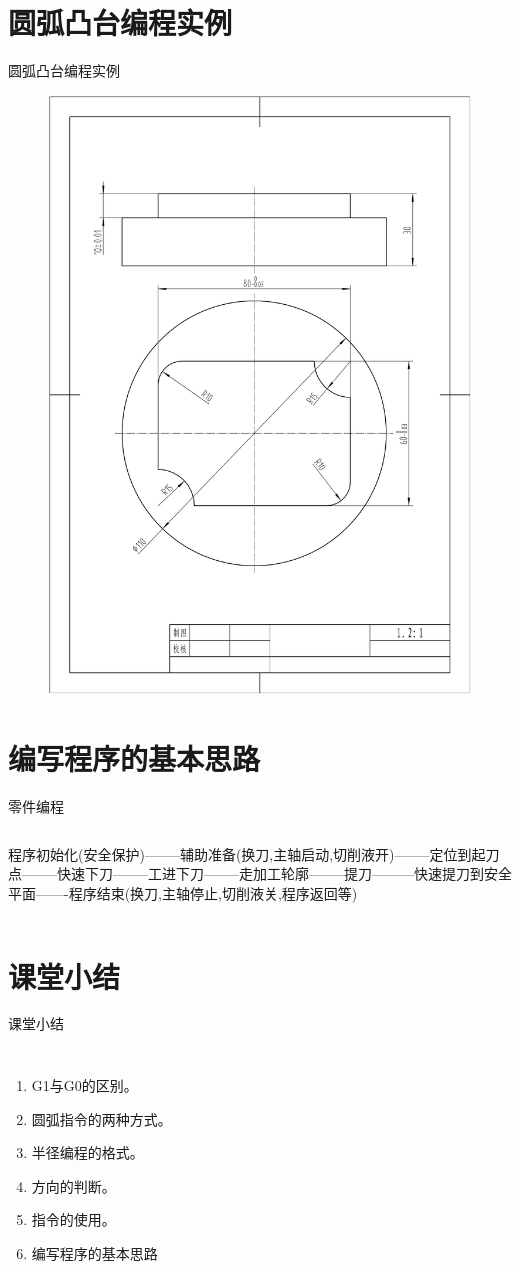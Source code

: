 \documentclass[UTF8,zihao=-4]{ctexbeamer}
\begin{document}
\section{圆弧凸台编程实例}
\begin{frame}{圆弧凸台编程实例}
    \begin{figure}
        \centering
        \includegraphics[width=0.5\linewidth,trim=50 150 50 100,clip]{image/4-1.jpg}
        \label{fig:4-8}
    \end{figure}       
\end{frame}

\section{编写程序的基本思路}
\begin{frame}{零件编程}
    \begin{columns}
        \column{\textwidth}
 程序初始化(安全保护)--------辅助准备(换刀,主轴启动,切削液开)--------定位到起刀点--------快速下刀--------工进下刀--------走加工轮廓--------提刀---------快速提刀到安全平面-------程序结束(换刀,主轴停止,切削液关,程序返回等)       
        
    \end{columns}
\end{frame}



\section*{课堂小结}
\begin{frame}{课堂小结}
    \begin{columns}
\begin{enumerate}
\item G1与G0的区别。
\item 圆弧指令的两种方式。
\item 半径编程的格式。
\item 方向的判断。
\item 指令的使用。
\item 编写程序的基本思路
\end{enumerate}
    \end{columns}
\end{frame}
\end{document}
